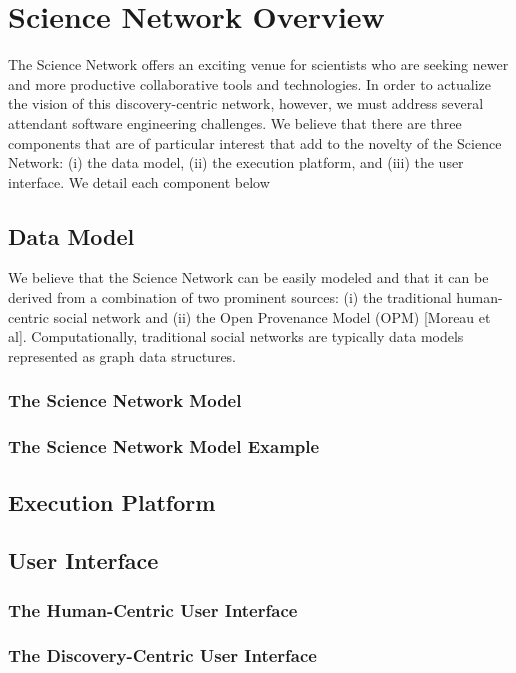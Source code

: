 \section{Science Network Overview}

The Science Network offers an exciting venue for scientists who are seeking newer and more productive
collaborative tools and technologies. In order to actualize the vision of this discovery-centric network,
however, we must address several attendant software engineering challenges. We believe that there are
three components that are of particular interest that add to the novelty of the Science Network: (i) the data
model, (ii) the execution platform, and (iii) the user interface. We detail each component below

\subsection{Data Model}

We believe that the Science Network can be easily modeled and that it can be derived from a combination of two prominent sources: (i) the traditional human-centric social network and (ii) the Open Provenance Model (OPM) [Moreau et al]. Computationally, traditional social networks are typically data models represented as graph data structures.

\subsubsection{The Science Network Model}


\subsubsection{The Science Network Model Example}


\subsection{Execution Platform}


\subsection{User Interface}

\subsubsection{The Human-Centric User Interface}

\subsubsection{The Discovery-Centric User Interface}

